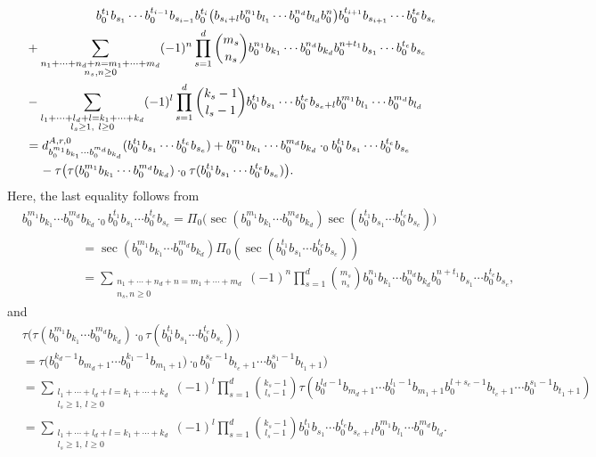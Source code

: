 \documentclass[12pt,reqno]{amsart}
\numberwithin{equation}{section}
\theoremstyle{definition}
\newcommand{\derrzero}[1]{d_{#1}^{A,r,0}}
\newcommand{\conczero}{\cdot_0}
\newcommand{\pizero}{\Pi_0}
\begin{document}
\begin{align}
&\hspace{2cm}b_0^{t_1}b_{s_1}\cdots b_0^{t_{i-1}}b_{s_{i-1}}b_0^{t_i}\big(b_{s_i+l}b_0^{n_1}b_{l_1}\cdots b_0^{n_d}b_{l_d}b_0^n\big)b_0^{t_{i+1}}b_{s_{i+1}}\cdots b_0^{t_e}b_{s_e} \nonumber \\
&+\sum_{\substack{n_1+\cdots+n_d+n=m_1+\cdots+m_d \\ n_s,n\geq0}} (-1)^n \prod_{s=1}^d \binom{m_s}{n_s}b_0^{n_1}b_{k_1}\cdots b_0^{n_d}b_{k_d}b_0^{n+t_1}b_{s_1}\cdots b_0^{t_e}b_{s_e} \nonumber\\
&- \sum_{\substack{l_1+\cdots+l_d+l=k_1+\cdots+k_d \\ l_s\geq1,\ l\geq0}} (-1)^l \prod_{s=1}^d \binom{k_s-1}{l_s-1} b_0^{t_1}b_{s_1}\cdots b_0^{t_e}b_{s_e+l}b_0^{m_1}b_{l_1}\cdots b_0^{m_d}b_{l_d} \nonumber \\
&= \derrzero{b_0^{m_1}b_{k_1}\cdots b_0^{m_d}b_{k_d}}(b_0^{t_1}b_{s_1}\cdots b_0^{t_e}b_{s_e}) + b_0^{m_1}b_{k_1}\cdots b_0^{m_d}b_{k_d} \conczero b_0^{t_1}b_{s_1}\cdots b_0^{t_e}b_{s_e} \nonumber \\
&\hspace{0.4cm}- \tau\big(\tau(b_0^{m_1}b_{k_1}\cdots b_0^{m_d}b_{k_d})\conczero \tau(b_0^{t_1}b_{s_1}\cdots b_0^{t_e}b_{s_e})\big). \nonumber
\end{align}
Here, the last equality follows from
\begin{align*}
&b_0^{m_1}b_{k_1}\cdots b_0^{m_d}b_{k_d} \conczero b_0^{t_1}b_{s_1}\cdots b_0^{t_e}b_{s_e}= \pizero\big(\sec(b_0^{m_1}b_{k_1}\cdots b_0^{m_d}b_{k_d}) \sec( b_0^{t_1}b_{s_1}\cdots b_0^{t_e}b_{s_e})\big) \\
&\hspace{2cm}=\sec(b_0^{m_1}b_{k_1}\cdots b_0^{m_d}b_{k_d}) \pizero(\sec( b_0^{t_1}b_{s_1}\cdots b_0^{t_e}b_{s_e})) \\
&\hspace{2cm}=\sum_{\substack{n_1+\cdots+n_d+n=m_1+\cdots+m_d \\ n_s,n\geq0}} (-1)^n \prod_{s=1}^d \binom{m_s}{n_s}b_0^{n_1}b_{k_1}\cdots b_0^{n_d}b_{k_d}b_0^{n+t_1}b_{s_1}\cdots b_0^{t_e}b_{s_e}, 
\end{align*}
and
\begin{align*}
&\tau\big(\tau(b_0^{m_1}b_{k_1}\cdots b_0^{m_d}b_{k_d})\conczero \tau(b_0^{t_1}b_{s_1}\cdots b_0^{t_e}b_{s_e})\big) \\
& = \tau\big(b_0^{k_d-1}b_{m_d+1}\cdots b_0^{k_1-1}b_{m_1+1})\conczero b_0^{s_e-1}b_{t_e+1}\cdots b_0^{s_1-1}b_{t_1+1}) \\
&= \sum_{\substack{l_1+\cdots+l_d+l=k_1+\cdots+k_d \\ l_s\geq1,\ l\geq0}} (-1)^l \prod_{s=1}^d \binom{k_s-1}{l_s-1}\tau(b_0^{l_d-1}b_{m_d+1}\cdots b_0^{l_1-1}b_{m_1+1}b_0^{l+s_e-1}b_{t_e+1}\cdots b_0^{s_1-1}b_{t_1+1}) \\
&=\sum_{\substack{l_1+\cdots+l_d+l=k_1+\cdots+k_d \\ l_s\geq1,\ l\geq0}} (-1)^l \prod_{s=1}^d \binom{k_s-1}{l_s-1} b_0^{t_1}b_{s_1}\cdots b_0^{t_e}b_{s_e+l}b_0^{m_1} b_{l_1}\cdots b_0^{m_d}b_{l_d}.
\end{align*}
\end{document}
